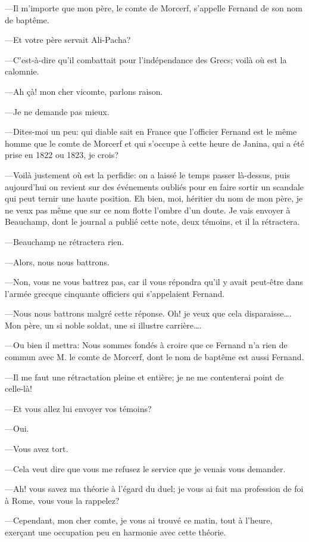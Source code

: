 —Il m'importe que mon père, le comte de Morcerf, s'appelle Fernand de son nom de baptême. 

—Et votre père servait Ali-Pacha? 

—C'est-à-dire qu'il combattait pour l'indépendance des Grecs; voilà où est la calomnie. 

—Ah çà! mon cher vicomte, parlons raison. 

—Je ne demande pas mieux. 

—Dites-moi un peu: qui diable sait en France que l'officier Fernand est le même homme que le comte de Morcerf et qui s'occupe à cette heure de Janina, qui a été prise en 1822 ou 1823, je crois? 

—Voilà justement où est la perfidie: on a laissé le temps passer là-dessus, puis aujourd'hui on revient sur des événements oubliés pour en faire sortir un scandale qui peut ternir une haute position. Eh bien, moi, héritier du nom de mon père, je ne veux pas même que sur ce nom flotte l'ombre d'un doute. Je vais envoyer à Beauchamp, dont le journal a publié cette note, deux témoins, et il la rétractera. 

—Beauchamp ne rétractera rien. 

—Alors, nous nous battrons. 

—Non, vous ne vous battrez pas, car il vous répondra qu'il y avait peut-être dans l'armée grecque cinquante officiers qui s'appelaient Fernand. 

—Nous nous battrons malgré cette réponse. Oh! je veux que cela disparaisse\dots. Mon père, un si noble soldat, une si illustre carrière\dots. 

—Ou bien il mettra: Nous sommes fondés à croire que ce Fernand n'a rien de commun avec M. le comte de Morcerf, dont le nom de baptême est aussi Fernand. 

—Il me faut une rétractation pleine et entière; je ne me contenterai point de celle-là! 

—Et vous allez lui envoyer vos témoins? 

—Oui. 

—Vous avez tort. 

—Cela veut dire que vous me refusez le service que je venais vous demander. 

—Ah! vous savez ma théorie à l'égard du duel; je vous ai fait ma profession de foi à Rome, vous vous la rappelez? 

—Cependant, mon cher comte, je vous ai trouvé ce matin, tout à l'heure, exerçant une occupation peu en harmonie avec cette théorie. 

